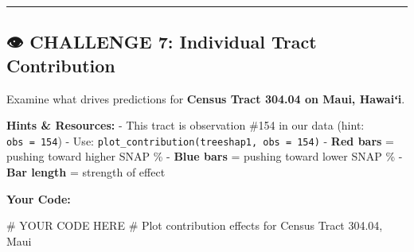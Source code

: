 \documentclass[
  letterpaper,
  DIV=11,
  numbers=noendperiod]{scrartcl}
\newenvironment{Shaded}{\begin{snugshade}}{\end{snugshade}}
\newcommand{\CommentTok}[1]{\textcolor[rgb]{0.37,0.37,0.37}{#1}}
\begin{document}
\begin{center}\rule{0.5\linewidth}{0.5pt}\end{center}

\subsection{👁️ CHALLENGE 7: Individual Tract
Contribution}\label{challenge-7-individual-tract-contribution}

\begin{tcolorbox}[enhanced jigsaw, title=\textcolor{quarto-callout-warning-color}{\faExclamationTriangle}\hspace{0.5em}{Your Task}, titlerule=0mm, coltitle=black, colbacktitle=quarto-callout-warning-color!10!white, colback=white, left=2mm, toprule=.15mm, opacitybacktitle=0.6, toptitle=1mm, colframe=quarto-callout-warning-color-frame, bottomtitle=1mm, arc=.35mm, bottomrule=.15mm, breakable, leftrule=.75mm, opacityback=0, rightrule=.15mm]

Examine what drives predictions for \textbf{Census Tract 304.04 on Maui,
Hawaiʻi}.

\textbf{Hints \& Resources:} - This tract is observation \#154 in our
data (hint: \texttt{obs\ =\ 154}) - Use:
\texttt{plot\_contribution(treeshap1,\ obs\ =\ 154)} - \textbf{Red bars}
= pushing toward higher SNAP \% - \textbf{Blue bars} = pushing toward
lower SNAP \% - \textbf{Bar length} = strength of effect

\textbf{Your Code:}

\end{tcolorbox}

\begin{Shaded}
\begin{Highlighting}[]
\CommentTok{\# YOUR CODE HERE}
\CommentTok{\# Plot contribution effects for Census Tract 304.04, Maui}
\end{Highlighting}
\end{Shaded}
\end{document}
